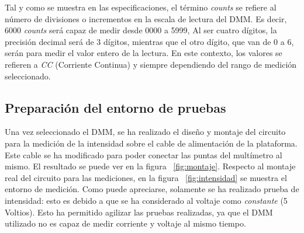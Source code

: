 Tal y como se muestra en las especificaciones, el término \textit{counts} se refiere al número de divisiones o incrementos en la escala de lectura del \ac{DMM}. Es decir, 6000 \textit{counts} será capaz de medir desde 0000 a 5999, Al ser cuatro dígitos, la precisión decimal será de 3 dígitos, mientras que el otro dígito, que van de 0 a 6, serán para medir el valor entero de la lectura. En este contexto, los valores se refieren a \emph{CC} (Corriente Continua) y siempre dependiendo del rango de medición seleccionado.

\subsection{Preparación del entorno de pruebas}
\label{subs:diseño}

Una vez seleccionado el \ac{DMM}, se ha realizado el diseño y montaje del circuito para la medición de la intensidad sobre el cable de alimentación de la plataforma. Este cable se ha modificado para poder conectar las puntas del multímetro al mismo. El resultado se puede ver en la figura ~\ref{fig:montaje}. Respecto al montaje real del circuito para las mediciones, en la figura ~\ref{fig:intensidad} se muestra el entorno de medición. Como puede apreciarse, solamente se ha realizado prueba de intensidad: esto es debido a que se ha considerado al voltaje como \emph{constante} (5 Voltios). Esto ha permitido agilizar las pruebas realizadas, ya que el \ac{DMM} utilizado no es capaz de medir corriente y voltaje al mismo tiempo.



